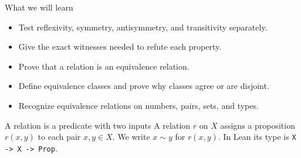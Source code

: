 

\begin{frame}
\titlepage
\end{frame}

\begin{frame}{What we will learn}
\begin{itemize}
\item Test reflexivity, symmetry, antisymmetry, and transitivity separately.
\item Give the exact witnesses needed to refute each property.
\item Prove that a relation is an equivalence relation.
\item Define equivalence classes and prove why classes agree or are disjoint.
\item Recognize equivalence relations on numbers, pairs, sets, and types.
\end{itemize}
\begin{block}{A relation is a predicate with two inputs}
A relation $r$ on $X$ assigns a proposition $r(x,y)$ to each pair $x,y\in X$.
We write $x\sim y$ for $r(x,y)$. In Lean its type is
\texttt{X -> X -> Prop}.
\end{block}
\end{frame}

